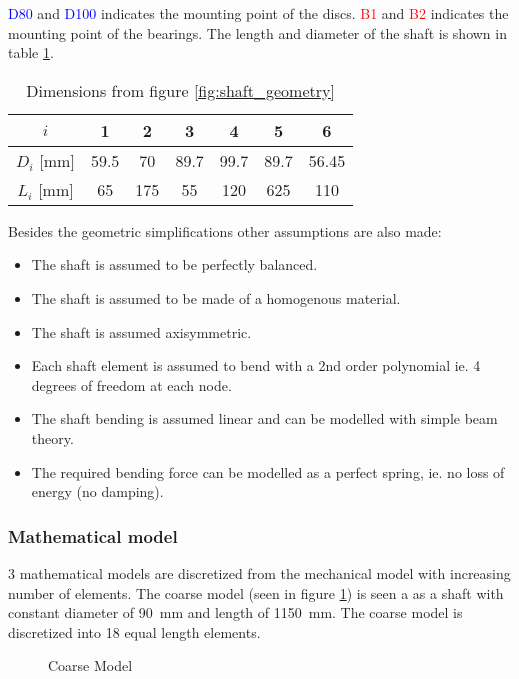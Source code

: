 \textcolor{blue}{D80} and \textcolor{blue}{D100} indicates the mounting point of the discs. \textcolor{red}{B1} and \textcolor{red}{B2} indicates the mounting point of the bearings.
The length and diameter of the shaft is shown in table \ref{tab:shaft_geometry}.
\begin{table}[htbp]
    \centering
    \caption{Dimensions from figure \ref{fig:shaft_geometry}}
    \label{tab:shaft_geometry}
    \begin{tabular}{@{}ccccccc@{}}
        \toprule
        $i$  &   1   &   2   &   3   &   4   &   5   &   6   \\ \midrule
        $D_i$ [\si{\milli \meter}]  &   59.5  &   70  &   89.7  &   99.7  &   89.7  &   56.45  \\
        $L_i$ [\si{\milli \meter}]  &   65 &   175    &   55 &   120  &   625  &   110    \\ \bottomrule
    \end{tabular}
\end{table}

Besides the geometric simplifications other assumptions are also made:
\begin{itemize}
    \item The shaft is assumed to be perfectly balanced.
    \item The shaft is assumed to be made of a homogenous material.
    \item The shaft is assumed axisymmetric.
    \item Each shaft element is assumed to bend with a 2nd order polynomial ie. 4 degrees of freedom at each node.
    \item The shaft bending is assumed linear and can be modelled with simple beam theory.
    \item The required bending force can be modelled as a perfect spring, ie. no loss of energy (no damping).
\end{itemize}

\subsubsection{Mathematical model}
3 mathematical models are discretized from the mechanical model with increasing number of elements. The coarse model (seen in figure \ref{fig:coarse_model}) is seen a as a shaft with constant diameter of \SI{90}{\milli \meter} and length of \SI{1150}{\milli \meter}. The coarse model is discretized into 18 equal length elements.
\begin{figure}[htbp]
    \centering
    
    \caption{Coarse Model}
    \label{fig:coarse_model}
\end{figure}

